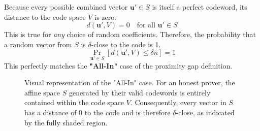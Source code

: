 \documentclass{article}
\begin{document}
\begin{tcolorbox}[breakable, title={Consequence for the Proximity Test}]
Because every possible combined vector $\mathbf{u}' \in S$ is itself a perfect codeword, its distance to the code space $V$ is zero.
\[ d(\mathbf{u}', V) = 0 \quad \text{for all } \mathbf{u}' \in S \]
This is true for \textit{any} choice of random coefficients. Therefore, the probability that a random vector from $S$ is $\delta$-close to the code is 1.
\[ \Pr_{\mathbf{u}' \in S} \left[ d(\mathbf{u}', V) \le \delta n \right] = 1 \]
This perfectly matches the \textbf{"All-In"} case of the proximity gap definition.
\end{tcolorbox}









 
\tikzset{
pattern size/.store in=\mcSize, 
pattern size = 5pt,
pattern thickness/.store in=\mcThickness, 
pattern thickness = 0.3pt,
pattern radius/.store in=\mcRadius, 
pattern radius = 1pt}
\makeatletter
{}
\makeatother
{} %

\begin{figure}[h!]
\centering
{} %

\caption{Visual representation of the "All-In" case. For an honest prover, the affine space $S$ generated by their valid codewords is entirely contained within the code space $V$. Consequently, every vector in $S$ has a distance of 0 to the code and is therefore $\delta$-close, as indicated by the fully shaded region.}
\label{fig:proximity_gap_honest}
\end{figure}
\end{document}
